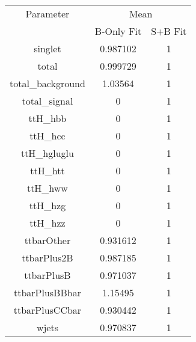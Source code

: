 \begin{table}
\centering

\begin{tabular}{ccc}
\toprule
Parameter & \multicolumn{2}{c}{Mean}\\
 & B-Only Fit & S+B Fit\\
\midrule
singlet & \num{0.987102} & \num{1}\\
total & \num{0.999729} & \num{1}\\
total\_background & \num{1.03564} & \num{1}\\
total\_signal & \num{0} & \num{1}\\
ttH\_hbb & \num{0} & \num{1}\\
ttH\_hcc & \num{0} & \num{1}\\
ttH\_hgluglu & \num{0} & \num{1}\\
ttH\_htt & \num{0} & \num{1}\\
ttH\_hww & \num{0} & \num{1}\\
ttH\_hzg & \num{0} & \num{1}\\
ttH\_hzz & \num{0} & \num{1}\\
ttbarOther & \num{0.931612} & \num{1}\\
ttbarPlus2B & \num{0.987185} & \num{1}\\
ttbarPlusB & \num{0.971037} & \num{1}\\
ttbarPlusBBbar & \num{1.15495} & \num{1}\\
ttbarPlusCCbar & \num{0.930442} & \num{1}\\
wjets & \num{0.970837} & \num{1}\\
\bottomrule
\end{tabular}
\end{table}
